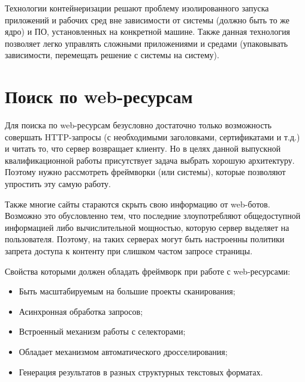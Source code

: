 Технологии контейнеризации решают проблему изолированного запуска приложений и
рабочих сред вне зависимости от системы (должно быть то же ядро) и ПО,
установленных на конкретной машине. Также данная технология позволяет легко
управлять сложными приложениями и средами (упаковывать зависимости, перемещать
решение с системы на систему). 


\section{Поиск по web-ресурсам}
Для поиска по web-ресурсам безусловно достаточно только возможность совершать
HTTP-запросы (с необходимыми заголовками, сертификатами и т.д.) и читать то, что
сервер возвращает клиенту. Но в целях данной выпускной квалификационной работы
присутствует задача выбрать хорошую архитектуру. Поэтому нужно рассмотреть
фреймворки (или системы), которые позволяют упростить эту самую работу.

Также многие сайты стараются скрыть свою информацию от web-ботов. Возможно это
обусловленно тем, что последние злоупотребляют общедоступной информацией либо
вычислительной мощностью, которую сервер выделяет на пользователя. Поэтому, на
таких серверах могут быть настроенны политики запрета доступа к контенту при
слишком частом запросе страницы.

Свойства которыми должен обладать фреймворк при работе с web-ресурсами:
\begin{itemize}
    \item Быть масштабируемым на большие проекты сканирования;
    \item Асинхронная обработка запросов;
    \item Встроенный механизм работы с селекторами;
    \item Обладает механизмом автоматического дросселирования;
    \item Генерация результатов в разных структурных текстовых форматах.
\end{itemize}

